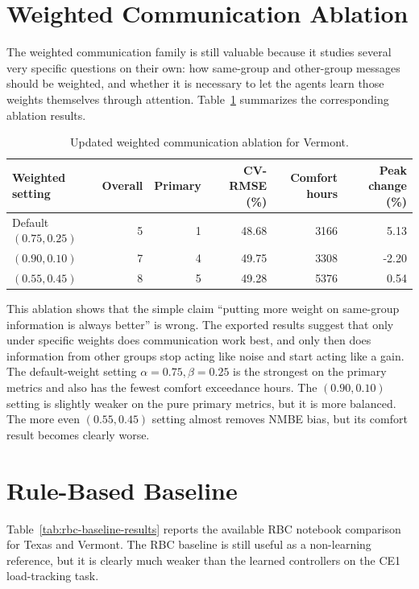 \section{Weighted Communication Ablation}

The weighted communication family is still valuable because it studies several
very specific questions on their own: how same-group and other-group messages
should be weighted, and whether it is necessary to let the agents learn those
weights themselves through attention. Table~\ref{tab:weighted-ablation}
summarizes the corresponding ablation results.

\begin{table}[!htbp]
\scriptsize
\begin{center}
\begin{tabular}{|l|r|r|r|r|r|}
\hline
Weighted setting & Overall & Primary & CV-RMSE (\%) & Comfort hours & Peak change (\%) \\
\hline
Default $(0.75,0.25)$ & 5 & 1 & 48.68 & 3166 & 5.13 \\
$(0.90,0.10)$ & 7 & 4 & 49.75 & 3308 & -2.20 \\
$(0.55,0.45)$ & 8 & 5 & 49.28 & 5376 & 0.54 \\
\hline
\end{tabular}
\end{center}
\caption{Updated weighted communication ablation for Vermont.}
\label{tab:weighted-ablation}
\end{table}

This ablation shows that the simple claim ``putting more weight on same-group
information is always better'' is wrong. The exported results suggest that only
under specific weights does communication work best, and only then does
information from other groups stop acting like noise and start acting like a
gain. The default-weight setting \mbox{$\alpha=0.75,\beta=0.25$} is the
strongest on the primary metrics and also has the fewest comfort exceedance
hours. The \mbox{$(0.90,0.10)$} setting is slightly weaker on the pure primary
metrics, but it is more balanced. The more even \mbox{$(0.55,0.45)$} setting
almost removes NMBE bias, but its comfort result becomes clearly worse.

\section{Rule-Based Baseline}

Table~\ref{tab:rbc-baseline-results} reports the available RBC notebook
comparison for Texas and Vermont. The RBC baseline is still useful as a
non-learning reference, but it is clearly much weaker than the learned
controllers on the CE1 load-tracking task.


